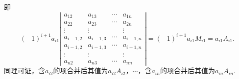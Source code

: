 \begin{frame} 
    即
    $$
    (-1)^{i+1}a_{i1} \left|
      \begin{array}{cccc}
        a_{12} & a_{13} & \cdots & a_{1n} \\
        a_{22} & a_{23} & \cdots & a_{2n}\\
        \vdots & \vdots & & \vdots \\
        a_{i-1,2} & a_{i-1,3}   & \cdots & a_{i-1,n}\\    
        a_{i-1,2} & a_{i-1,3}   & \cdots & a_{i-1,n}\\
        \vdots & \vdots & & \vdots \\
        a_{n2}  & a_{n3} & \cdots & a_{nn}
      \end{array}
    \right| = (-1)^{i+1}a_{i1} M_{i1} = a_{i1} A_{i1}.
    $$
    同理可证，含$a_{i2}$的项合并后其值为$a_{i2}A_{i2}$，$\cdots$，含$a_{in}$的项合并后其值为$a_{in}A_{in}$.  
 
\end{frame}

